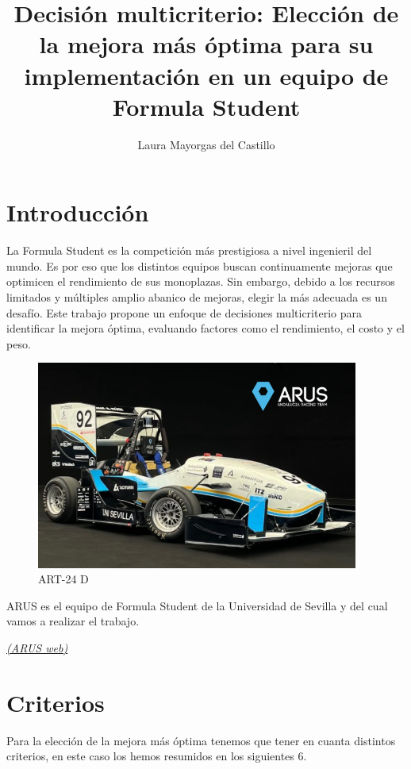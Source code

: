 \documentclass[
]{article}
\title{Decisión multicriterio: Elección de la mejora más óptima para su
implementación en un equipo de Formula Student}
\author{Laura Mayorgas del Castillo}
\date{}
\begin{document}
\maketitle

{
\setcounter{tocdepth}{2}
\tableofcontents
}
\newpage

\section{Introducción}\label{introducciuxf3n}

La Formula Student es la competición más prestigiosa a nivel ingenieril
del mundo. Es por eso que los distintos equipos buscan continuamente
mejoras que optimicen el rendimiento de sus monoplazas. Sin embargo,
debido a los recursos limitados y múltiples amplio abanico de mejoras,
elegir la más adecuada es un desafío. Este trabajo propone un enfoque de
decisiones multicriterio para identificar la mejora óptima, evaluando
factores como el rendimiento, el costo y el peso.

\begin{figure}
\centering
\includegraphics[width=4.16667in,height=\textheight]{Fotos/fotomonoplazas.png}
\caption{ART-24 D}
\end{figure}

ARUS es el equipo de Formula Student de la Universidad de Sevilla y del
cual vamos a realizar el trabajo.

\href{https://www.arusteam.com/}{\emph{(ARUS web)}}

\section{Criterios}\label{criterios}

Para la elección de la mejora más óptima tenemos que tener en cuanta
distintos criterios, en este caso los hemos resumidos en los siguientes
6.
\end{document}

